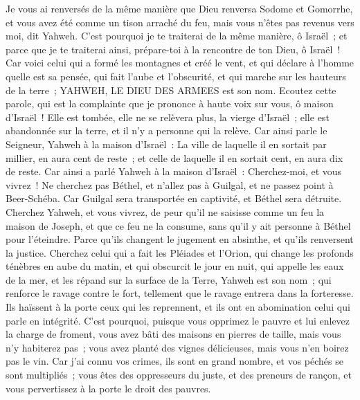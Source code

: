 \begin{multicols}{2}
Je vous ai renversés de la même manière que Dieu renversa Sodome et Gomorrhe, et vous avez été comme un tison arraché du feu, mais vous n'êtes pas revenus vers moi, dit Yahweh.
C'est pourquoi je te traiterai de la même manière, ô Israël~; et parce que je te traiterai ainsi, prépare-toi à la rencontre de ton Dieu, ô Israël~!
Car voici celui qui a formé les montagnes et créé le vent, et qui déclare à l'homme quelle est sa pensée, qui fait l'aube et l'obscurité, et qui marche sur les hauteurs de la terre~; YAHWEH, LE DIEU DES ARMEES est son nom.
\VerseOne{}Ecoutez cette parole, qui est la complainte que je prononce à haute voix sur vous, ô maison d'Israël~!
Elle est tombée, elle ne se relèvera plus, la vierge d'Israël~; elle est abandonnée sur la terre, et il n'y a personne qui la relève.
Car ainsi parle le Seigneur, Yahweh à la maison d'Israël~: La ville de laquelle il en sortait par millier, en aura cent de reste~; et celle de laquelle il en sortait cent, en aura dix de reste.
Car ainsi a parlé Yahweh à la maison d'Israël~: Cherchez-moi, et vous vivrez~!
Ne cherchez pas Béthel, et n'allez pas à Guilgal, et ne passez point à Beer-Schéba. Car Guilgal sera transportée en captivité, et Béthel sera détruite.
Cherchez Yahweh, et vous vivrez, de peur qu'il ne saisisse comme un feu la maison de Joseph, et que ce feu ne la consume, sans qu'il y ait personne à Béthel pour l'éteindre.
Parce qu'ils changent le jugement en absinthe, et qu'ils renversent la justice.
Cherchez celui qui a fait les Pléiades et l'Orion, qui change les profonds ténèbres en aube du matin, et qui obscurcit le jour en nuit, qui appelle les eaux de la mer, et les répand sur la surface de la Terre, Yahweh est son nom~;
qui renforce le ravage contre le fort, tellement que le ravage entrera dans la forteresse.
Ils haïssent à la porte ceux qui les reprennent, et ils ont en abomination celui qui parle en intégrité.
C'est pourquoi, puisque vous opprimez le pauvre et lui enlevez la charge de froment, vous avez bâti des maisons en pierres de taille, mais vous n'y habiterez pas~; vous avez planté des vignes délicieuses, mais vous n'en boirez pas le vin.
Car j'ai connu vos crimes, ils sont en grand nombre, et vos péchés se sont multipliés~; vous êtes des oppresseurs du juste, et des preneurs de rançon, et vous pervertissez à la porte le droit des pauvres. 

\end{multicols}
